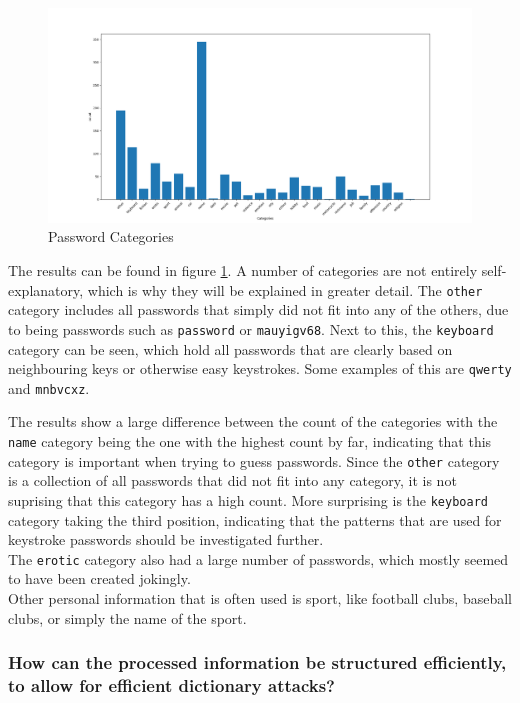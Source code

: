 \documentclass[a4paper,12pt]{article}
\begin{document}
\begin{figure}[!ht]
  \centering
  \hspace*{-4.3cm}
  \includegraphics[width=1.7\textwidth]{password_categories}
  \caption{Password Categories}
  \label{fig:pcat}
\end{figure}

The results can be found in figure \ref{fig:pcat}. A number of categories are not entirely self-explanatory, which is why they will be explained in greater detail. The \lstinline{other} category includes all passwords that simply did not fit into any of the others, due to being passwords such as \lstinline{password} or \lstinline{mauyigv68}. Next to this, the \lstinline{keyboard} category can be seen, which hold all passwords that are clearly based on neighbouring keys or otherwise easy keystrokes. Some examples of this are \lstinline{qwerty} and \lstinline{mnbvcxz}.

The results show a large difference between the count of the categories with the \lstinline{name} category being the one with the highest count by far, indicating that this category is important when trying to guess passwords. Since the \lstinline{other} category is a collection of all passwords that did not fit into any category, it is not suprising that this category has a high count. More surprising is the \lstinline{keyboard} category taking the third position, indicating that the patterns that are used for keystroke passwords should be investigated further.\\
The \lstinline{erotic} category also had a large number of passwords, which mostly seemed to have been created jokingly.\\

Other personal information that is often used is sport, like football clubs, baseball clubs, or simply the name of the sport.

\subsubsection{How can the processed information be structured efficiently, to allow for efficient dictionary attacks?}
\end{document}
